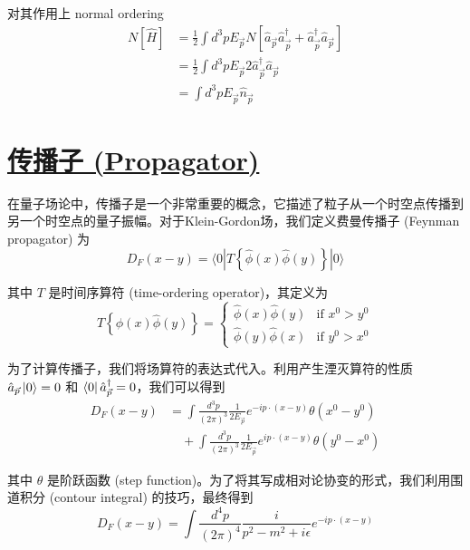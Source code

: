对其作用上 normal ordering
\begin{align*}
    N\left[\hat{H}\right] &= \frac{1}{2}\int d^3p E_{\vec{p}} N\left[\hat{a}_{\vec{p}}\hat{a}_{\vec{p}}^\dagger + \hat{a}_{\vec{p}}^\dagger \hat{a}_{\vec{p}}\right] \\
    &= \frac{1}{2}\int d^3p E_{\vec{p}}2\hat{a}_{\vec{p}}^\dagger\hat{a}_{\vec{p}} \\
    &=\int d^3 p E_{\vec{p}} \hat{n}_{\vec{p}}
\end{align*}

\section{\protect\hyperlink{:}{传播子 (Propagator)}}

在量子场论中，传播子是一个非常重要的概念，它描述了粒子从一个时空点传播到另一个时空点的量子振幅。对于Klein-Gordon场，我们定义费曼传播子 (Feynman propagator) 为
\begin{equation*}
    D_F(x-y) = \langle 0 | T\left\{\hat{\phi}(x)\hat{\phi}(y)\right\} | 0 \rangle
\end{equation*}

其中 $T$ 是时间序算符 (time-ordering operator)，其定义为
\begin{equation*}
    T\left\{\hat{\phi}(x)\hat{\phi}(y)\right\} = 
    \begin{cases}
        \hat{\phi}(x)\hat{\phi}(y) & \text{if } x^0 > y^0 \\
        \hat{\phi}(y)\hat{\phi}(x) & \text{if } y^0 > x^0
    \end{cases}
\end{equation*}

为了计算传播子，我们将场算符的表达式代入。利用产生湮灭算符的性质 $\hat{a}_{\vec{p}}\ket{0} = 0$ 和 $\bra{0}\hat{a}_{\vec{p}}^\dagger = 0$，我们可以得到
\begin{align*}
    D_F(x-y) &= \int \frac{d^3p}{(2\pi)^3} \frac{1}{2E_{\vec{p}}} e^{-ip\cdot(x-y)} \theta(x^0-y^0) \\
    &\quad + \int \frac{d^3p}{(2\pi)^3} \frac{1}{2E_{\vec{p}}} e^{ip\cdot(x-y)} \theta(y^0-x^0)
\end{align*}

其中 $\theta$ 是阶跃函数 (step function)。为了将其写成相对论协变的形式，我们利用围道积分 (contour integral) 的技巧，最终得到
\begin{equation*}
    D_F(x-y) = \int \frac{d^4p}{(2\pi)^4} \frac{i}{p^2 - m^2 + i\epsilon} e^{-ip\cdot(x-y)}
\end{equation*}

